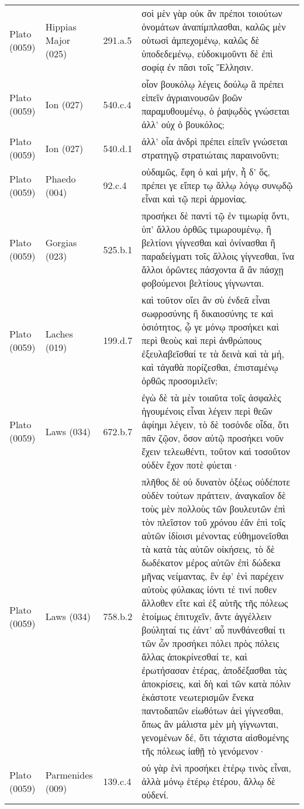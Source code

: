 \begin{longtable}{llll}
Plato (0059) & Hippias Major (025) & 291.a.5 & σοὶ μὲν γὰρ οὐκ ἂν πρέποι τοιούτων ὀνομάτων ἀναπίμπλασθαι, καλῶς μὲν οὑτωσὶ ἀμπεχομένῳ, καλῶς δὲ ὑποδεδεμένῳ, εὐδοκιμοῦντι δὲ ἐπὶ σοφίᾳ ἐν πᾶσι τοῖς Ἕλλησιν.\\
Plato (0059) & Ion (027) & 540.c.4 & οἷον βουκόλῳ λέγεις δούλῳ ἃ πρέπει εἰπεῖν ἀγριαινουσῶν βοῶν παραμυθουμένῳ, ὁ ῥαψῳδὸς γνώσεται ἀλλ’ οὐχ ὁ βουκόλος;\\
\addlinespace
Plato (0059) & Ion (027) & 540.d.1 & ἀλλ’ οἷα ἀνδρὶ πρέπει εἰπεῖν γνώσεται στρατηγῷ στρατιώταις παραινοῦντι;\\
Plato (0059) & Phaedo (004) & 92.c.4 & οὐδαμῶς, ἔφη ὁ καὶ μήν, ἦ δ’ ὅς, πρέπει γε εἴπερ τῳ ἄλλῳ λόγῳ συνῳδῷ εἶναι καὶ τῷ περὶ ἁρμονίας.\\
Plato (0059) & Gorgias (023) & 525.b.1 & προσήκει δὲ παντὶ τῷ ἐν τιμωρίᾳ ὄντι, ὑπ’ ἄλλου ὀρθῶς τιμωρουμένῳ, ἢ βελτίονι γίγνεσθαι καὶ ὀνίνασθαι ἢ παραδείγματι τοῖς ἄλλοις γίγνεσθαι, ἵνα ἄλλοι ὁρῶντες πάσχοντα ἃ ἂν πάσχῃ φοβούμενοι βελτίους γίγνωνται.\\
Plato (0059) & Laches (019) & 199.d.7 & καὶ τοῦτον οἴει ἂν σὺ ἐνδεᾶ εἶναι σωφροσύνης ἢ δικαιοσύνης τε καὶ ὁσιότητος, ᾧ γε μόνῳ προσήκει καὶ περὶ θεοὺς καὶ περὶ ἀνθρώπους ἐξευλαβεῖσθαί τε τὰ δεινὰ καὶ τὰ μή, καὶ τἀγαθὰ πορίζεσθαι, ἐπισταμένῳ ὀρθῶς προσομιλεῖν;\\
Plato (0059) & Laws (034) & 672.b.7 & ἐγὼ δὲ τὰ μὲν τοιαῦτα τοῖς ἀσφαλὲς ἡγουμένοις εἶναι λέγειν περὶ θεῶν ἀφίημι λέγειν, τὸ δὲ τοσόνδε οἶδα, ὅτι πᾶν ζῷον, ὅσον αὐτῷ προσήκει νοῦν ἔχειν τελεωθέντι, τοῦτον καὶ τοσοῦτον οὐδὲν ἔχον ποτὲ φύεται·\\
\addlinespace
Plato (0059) & Laws (034) & 758.b.2 & πλῆθος δὲ οὐ δυνατὸν ὀξέως οὐδέποτε οὐδὲν τούτων πράττειν, ἀναγκαῖον δὲ τοὺς μὲν πολλοὺς τῶν βουλευτῶν ἐπὶ τὸν πλεῖστον τοῦ χρόνου ἐᾶν ἐπὶ τοῖς αὑτῶν ἰδίοισι μένοντας εὐθημονεῖσθαι τὰ κατὰ τὰς αὑτῶν οἰκήσεις, τὸ δὲ δωδέκατον μέρος αὐτῶν ἐπὶ δώδεκα μῆνας νείμαντας, ἓν ἐφ’ ἑνὶ παρέχειν αὐτοὺς φύλακας ἰόντι τέ τινί ποθεν ἄλλοθεν εἴτε καὶ ἐξ αὐτῆς τῆς πόλεως ἑτοίμως ἐπιτυχεῖν, ἄντε ἀγγέλλειν βούληταί τις ἐάντ’ αὖ πυνθάνεσθαί τι τῶν ὧν προσήκει πόλει πρὸς πόλεις ἄλλας ἀποκρίνεσθαί τε, καὶ ἐρωτήσασαν ἑτέρας, ἀποδέξασθαι τὰς ἀποκρίσεις, καὶ δὴ καὶ τῶν κατὰ πόλιν ἑκάστοτε νεωτερισμῶν ἕνεκα παντοδαπῶν εἰωθότων ἀεὶ γίγνεσθαι, ὅπως ἂν μάλιστα μὲν μὴ γίγνωνται, γενομένων δέ, ὅτι τάχιστα αἰσθομένης τῆς πόλεως ἰαθῇ τὸ γενόμενον·\\
Plato (0059) & Parmenides (009) & 139.c.4 & οὐ γὰρ ἑνὶ προσήκει ἑτέρῳ τινὸς εἶναι, ἀλλὰ μόνῳ ἑτέρῳ ἑτέρου, ἄλλῳ δὲ οὐδενί.\\

\end{longtable}

